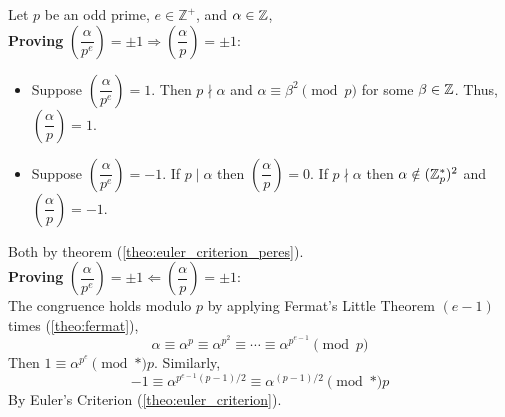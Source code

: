 \newpage

\begin{Proof}
    Let $p$ be an odd prime, $e\in\mathbb{Z^+}$, and $\alpha\in\mathbb{Z}$,\\

    \noindent
    \textbf{Proving} $\left(\dfrac{\alpha}{p^e}\right)=\pm1\Longrightarrow\left(\dfrac{\alpha}{p}\right)=\pm1$:
    \begin{itemize}
        \item Suppose $\left(\dfrac{\alpha}{p^e}\right)=1$. Then $p\nmid\alpha$ and $\alpha\equiv\beta^2\pmod{p}$ for some $\beta\in\mathbb{Z}$. Thus, $\left(\dfrac{\alpha}{p}\right)=1$.
        \item Suppose $\left(\dfrac{\alpha}{p^e}\right)=-1$. If $p\mid\alpha$ then $\left(\dfrac{\alpha}{p}\right)=0$. If $p\nmid\alpha$ then $\alpha\notin(\mathbb{Z}_p^*)^2$ and $\left(\dfrac{\alpha}{p}\right)=-1$.
    \end{itemize}
    \noindent
    Both by theorem (\ref{theo:euler_criterion_peres}).\\

    \noindent
    \textbf{Proving} $\left(\dfrac{\alpha}{p^e}\right)=\pm1\Longleftarrow\left(\dfrac{\alpha}{p}\right)=\pm1$:\\
    The congruence holds modulo $p$ by applying Fermat's Little Theorem $(e-1)$ times (\ref{theo:fermat}),
    \[\alpha\equiv\alpha^p\equiv \alpha^{p^2}\equiv\cdots\equiv\alpha^{p^{e-1}}\pmod{p}\] 
    \noindent
    Then $1\equiv \alpha^{p^e}\pmod*{p}$. Similarly,
    \[
        -1\equiv \alpha^{p^{e-1}(p-1)/2}\equiv\alpha^{(p-1)/2}\pmod*{p}
    \]
    \noindent
    By Euler's Criterion (\ref{theo:euler_criterion}).
\end{Proof}

